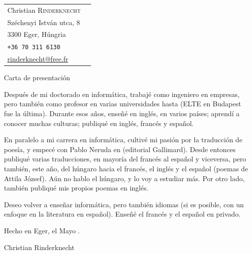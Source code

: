 \documentclass[a4paper,11pt]{article}
\begin{document}
\noindent
\begin{tabular}{@{}l@{\qquad\qquad\qquad}r@{}}
  Christian \textsc{Rinderknecht}
  & \\
  Széchenyi István utca, 8
  & \\
  3300 Eger, Húngria \\
  \texttt{+36 70 311 6130} \\
  \url{rinderknecht@free.fr}
\end{tabular}

\bigskip

\begin{center}
  \large Carta de presentación
\end{center}

\bigskip

Después de mi doctorado en informática, trabajé como ingeniero en
empresas, pero también como profesor en varias universidades hasta
 (ELTE en Budapest fue la última). Durante esos
años, enseñé en inglés, en varios países; aprendí a conocer muchas
culturas; publiqué en inglés, francés y español.

En paralelo a mi carrera en informática, cultivé mi pasión por la
traducción de poesía, y empecé con Pablo Neruda en 
(editorial Gallimard). Desde entonces publiqué varias traducciones, en
mayoría del francés al español y viceversa, pero también, este año,
del húngaro hacia el francés, el inglés y el español (poemas de Attila
József). Aún no hablo el húngaro, y lo voy a estudiar más. Por otro
lado, también publiqué mis propios poemas en inglés.

Deseo volver a enseñar informática, pero también idiomas (si es
posible, con un enfoque en la literatura en español). Enseñé el
francés y el español en privado.

%

\bigskip
\bigskip

\hfill Hecho en Eger, el  Mayo .

\bigskip
\bigskip
\bigskip
\bigskip
\hfill Christian Rinderknecht

\bigskip
\end{document}
